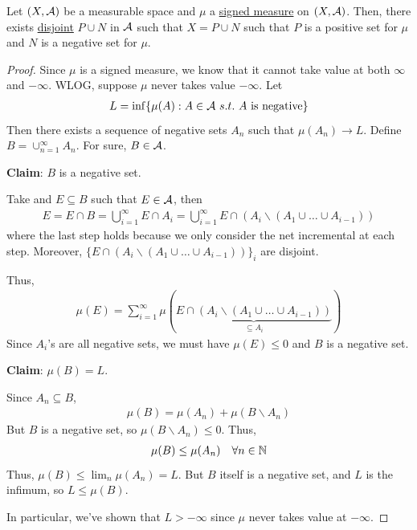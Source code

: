 \documentclass[11pt]{article}
\begin{document}
	\begin{theorem}
		Let $(X, \mathcal{{A}})$ be a measurable space and $\mu$ a \ul{signed measure} on $(X, \mathcal{{A}})$. Then, there exists \ul{disjoint} $P \cup N$ in $\mathcal{{A}}$ such that $X = P \cup N$ such that $P$ is a positive set for $\mu$ and $N$ is a negative set for $\mu$.
		\begin{proof}
			Since $\mu$ is a signed measure, we know that it cannot take value at both $\infty$ and $-\infty$. WLOG, suppose $\mu$ never takes value $-\infty$.
			Let
			\begin{align}
				L = \inf\{\mu(A) : A \in \mathcal{{A}}\ s.t.\ A \text{{ is negative}}\}
			\end{align}
			Then there exists a sequence of negative sets $A_n$ such that $\mu(A_n) \to L$. Define $B = \cup_{n=1}^\infty A_n$. For sure, $B \in \mathcal{{A}}$.
			\begin{tcolorbox}
				\textbf{Claim}: $B$ is a negative set.
				
				Take and $E \subseteq B$ such that $E \in \mathcal{{A}}$, then
				\begin{align}
					E = E \cap B = \bigcup_{i=1}^\infty E \cap A_i = \bigcup_{i=1}^\infty E \cap (A_i \backslash (A_1 \cup \dots \cup A_{i-1}))
				\end{align}
				where the last step holds because we only consider the net incremental at each step. Moreover, $\{E \cap (A_i \backslash (A_1 \cup \dots \cup A_{i-1}))\}_i$ are disjoint.
				
				Thus, 
				\begin{align}
					\mu(E) = \sum_{i=1}^\infty \mu(\underbrace{E \cap (A_i \backslash (A_1 \cup \dots \cup A_{i-1}))}_{\subseteq A_i})
				\end{align}
				Since $A_i$'s are all negative sets, we must have $\mu(E) \leq 0$ and $B$ is a negative set.
			\end{tcolorbox}
			\begin{tcolorbox}
				\textbf{Claim}: $\mu(B) = L$.
				
				Since $A_n \subseteq B$,
				\begin{align}
					\mu(B) = \mu(A_n) + \mu(B \backslash A_n)
				\end{align}
				But $B$ is a negative set, so $\mu(B \backslash A_n)\leq 0$. Thus,
				\begin{align}
					\mu(B) \leq \mu(A_n)\quad \forall n \in \mathbb{N}
				\end{align}
				Thus, $\mu(B) \leq \lim_n \mu(A_n) = L$. But $B$ itself is a negative set, and $L$ is the infimum, so $L \leq \mu(B)$.
			\end{tcolorbox}
			In particular, we've shown that $L > -\infty$ since $\mu$ never takes value at $-\infty$.
			

\end{proof}
\end{theorem}
\end{document}
